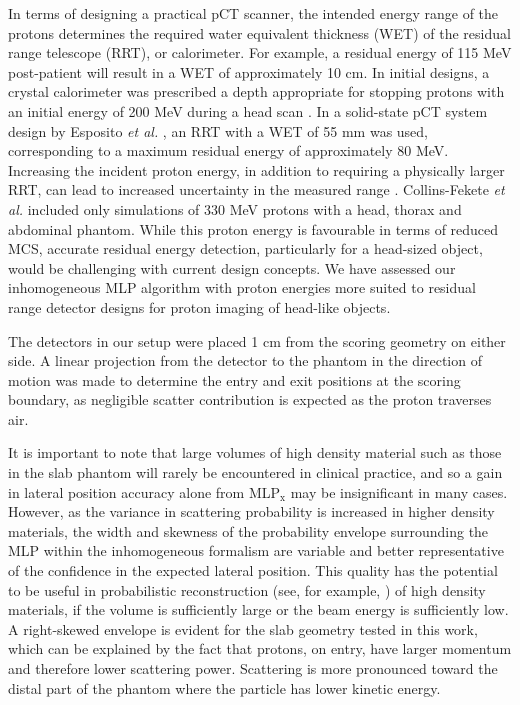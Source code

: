 \documentclass[preprint,times]{elsarticle}
\begin{document}
In terms of designing a practical pCT scanner, the intended energy range of the protons determines the required water equivalent thickness (WET) of the residual range telescope (RRT), or calorimeter. For example, a residual energy of 115 MeV post-patient will result in a WET of approximately 10 cm. In initial designs, a crystal calorimeter was prescribed a depth appropriate for stopping protons with an initial energy of 200 MeV during a head scan \citep{Bashkirov2016}. In a solid-state pCT system design by Esposito \emph{et al.} \citep{pravda}, an RRT with a WET of 55 mm was used, corresponding to a maximum residual energy of approximately 80 MeV. Increasing the incident proton energy, in addition to requiring a physically larger RRT, can lead to increased uncertainty in the measured range \citep{Price2015}. Collins-Fekete \emph{et al.} \citep{Collins2017} included only simulations of 330 MeV protons with a head, thorax and abdominal phantom. While this proton energy is favourable in terms of reduced MCS, accurate residual energy detection, particularly for a head-sized object, would be challenging with current design concepts. We have assessed our inhomogeneous MLP algorithm with proton energies more suited to residual range detector designs for proton imaging of head-like objects.

The detectors in our setup were placed 1 cm from the scoring geometry on either side. A linear projection from the detector to the phantom in the direction of motion was made to determine the entry and exit positions at the scoring boundary, as negligible scatter contribution is expected as the proton traverses air.

It is important to note that large volumes of high density material such as those in the slab phantom will rarely be encountered in clinical practice, and so a gain in lateral position accuracy alone from MLP$_\mathrm{x}$ may be insignificant in many cases. However, as the variance in scattering probability is increased in higher density materials, the width and skewness of the probability envelope surrounding the MLP within the inhomogeneous formalism are variable and better representative of the confidence in the expected lateral position. This quality has the potential to be useful in probabilistic reconstruction (see, for example, \citep{wangmackietome}) of high density materials, if the volume is sufficiently large or the beam energy is sufficiently low. A right-skewed envelope is evident for the slab geometry tested in this work, which can be explained by the fact that protons, on entry, have larger momentum and therefore lower scattering power. Scattering is more pronounced toward the distal part of the phantom where the particle has lower kinetic energy.
\end{document}
